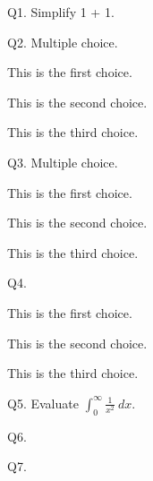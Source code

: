 


\renewcommand\COURSENAME{System Penetration and Hacking}
\renewcommand\COURSESHORTNAME{System Penetration \& Hacking}
\renewcommand\COURSENUMBER{CISS999}
\renewcommand\TITLE{Quiz 42}
\usepackage{python}


\topmatter


Q1. Simplify 1 + 1.

Q2. Multiple choice.
\begin{tightlist}
\item[\qed] This is the first choice.
\item[\qed] This is the second choice.
\item[\qed] This is the third choice.
\end{tightlist}

Q3. Multiple choice.
\begin{tightlist}
\item[$\bigcirc$] This is the first choice.
\item[$\bigcirc$] This is the second choice.
\item[$\bigcirc$] This is the third choice.
\end{tightlist}


Q4. \lipsum[1]
\vspace{-\parskip}
\begin{mylist}
\item[$\bigcirc$] This is the first choice.
\item[$\bigcirc$] This is the second choice.
\item[$\bigcirc$] This is the third choice.
\end{mylist}


Q5. Evaluate $\int_0^\infty \frac{1}{x^2} \ dx$.

Q6. \lipsum[3-5]

Q7. \lipsum[6]


